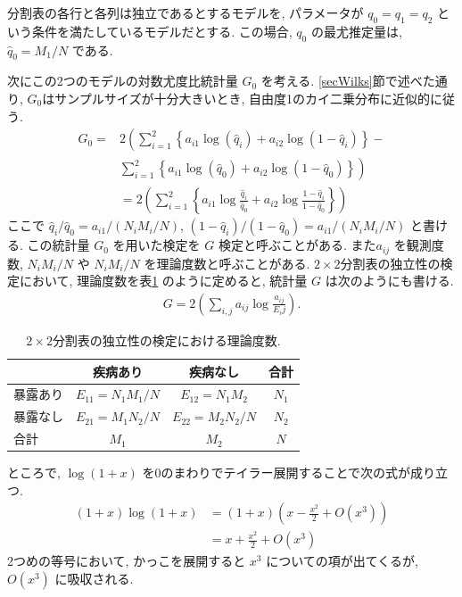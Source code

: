\documentclass[a4paper, 12pt]{jarticle}
\begin{document}
分割表の各行と各列は独立であるとするモデルを, パラメータが $q_0=q_1=q_2$ という条件を満たしているモデルだとする. 
この場合, $q_0$ の最尤推定量は, $\hat q_{0}=M_1/N$ である.

次にこの2つのモデルの対数尤度比統計量 $G_0$ を考える.
\ref{secWilks}節で述べた通り, $G_0$はサンプルサイズが十分大きいとき, 自由度1のカイ二乗分布に近似的に従う. 
\begin{align}
G_0 =& 2 \left(\sum_{i=1}^2 \left\{ a_{i1}\log(\hat q_i)+ a_{i2}\log(1-\hat q_i)\right\} -\right. \\
&\left.\sum_{i=1}^2 \left\{ a_{i1}\log(\hat q_0) + a_{i2}\log(1-\hat q_0)\right\}\right)\\
&= 2 \left(\sum_{i=1}^2\left\{ a_{i1}\log\frac{\hat q_i}{\hat q_0} + a_{i2}\log\frac{1-\hat q_i}{1-\hat q_0}\right\}\right)
\end{align}
ここで $\hat q_i/\hat q_0 = a_{i1}/(N_iM_i/N)$,  $(1-\hat q_i)/(1-\hat q_0) = a_{i1}/(N_iM_i/N)$ と書ける.
この統計量 $G_0$ を用いた検定を $G$ 検定と呼ぶことがある.
また$a_{ij}$ を観測度数, $N_iM_i/N$ や $N_iM_i/N$ を理論度数と呼ぶことがある.
$2 \times 2$分割表の独立性の検定において, 理論度数を表\ref{2by2theo} のように定めると, 統計量 $G$ は次のようにも書ける.
\begin{align}
G = 2 \left(\sum_{i,j} a_{ij}\log\frac{a_{ij}}{E_ij} \right).
\end{align}
\begin{table}[htbp]
\centering
\caption{$2 \times 2$分割表の独立性の検定における理論度数.}
\label{2by2theo}
\begin{tabular}{l|cc|c}
 & 疾病あり&疾病なし&合計\\
 \hline
 暴露あり&$E_{11} = N_1M_1/N$&$E_{12} = N_1M_2$&$N_1$\\
 暴露なし&$E_{21} = M_1N_2/N $&$E_{22}=M_2N_2/N$&$N_2$\\
  \hline
 合計 & $M_1$ & $M_2$ & $N$
\end{tabular}
\end{table}

ところで, $\log (1+x)$ を0のまわりでテイラー展開することで次の式が成り立つ. 
\begin{align}
(1+x) \log (1+x) &= (1+x)\left(x-\frac{x^2}{2} + O(x^3)\right) \\
& = x + \frac{x^2}{2} +  O(x^3)
\end{align}
2つめの等号において, かっこを展開すると $x^3$ についての項が出てくるが, $O(x^3)$ に吸収される.
\end{document}
